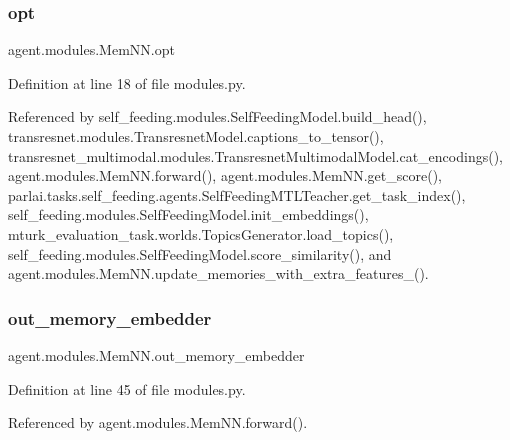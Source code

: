 \subsubsection{\texorpdfstring{opt}{opt}}
{\footnotesize\ttfamily agent.\+modules.\+Mem\+N\+N.\+opt}



Definition at line 18 of file modules.\+py.



Referenced by self\+\_\+feeding.\+modules.\+Self\+Feeding\+Model.\+build\+\_\+head(), transresnet.\+modules.\+Transresnet\+Model.\+captions\+\_\+to\+\_\+tensor(), transresnet\+\_\+multimodal.\+modules.\+Transresnet\+Multimodal\+Model.\+cat\+\_\+encodings(), agent.\+modules.\+Mem\+N\+N.\+forward(), agent.\+modules.\+Mem\+N\+N.\+get\+\_\+score(), parlai.\+tasks.\+self\+\_\+feeding.\+agents.\+Self\+Feeding\+M\+T\+L\+Teacher.\+get\+\_\+task\+\_\+index(), self\+\_\+feeding.\+modules.\+Self\+Feeding\+Model.\+init\+\_\+embeddings(), mturk\+\_\+evaluation\+\_\+task.\+worlds.\+Topics\+Generator.\+load\+\_\+topics(), self\+\_\+feeding.\+modules.\+Self\+Feeding\+Model.\+score\+\_\+similarity(), and agent.\+modules.\+Mem\+N\+N.\+update\+\_\+memories\+\_\+with\+\_\+extra\+\_\+features\+\_\+().

\mbox{\label{classagent_1_1modules_1_1MemNN_a439ffece4195cb7ca400c19f79db7f92}} 
\subsubsection{\texorpdfstring{out\+\_\+memory\+\_\+embedder}{out\_memory\_embedder}}
{\footnotesize\ttfamily agent.\+modules.\+Mem\+N\+N.\+out\+\_\+memory\+\_\+embedder}



Definition at line 45 of file modules.\+py.



Referenced by agent.\+modules.\+Mem\+N\+N.\+forward().

\mbox{\label{classagent_1_1modules_1_1MemNN_ac0718034c9a8f595e0f138fc73c20a80}} 
